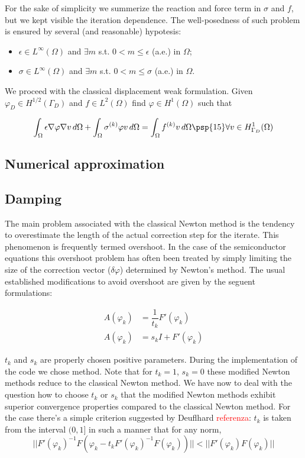 For the sake of simplicity we summerize the reaction and force term in $\sigma$ and $f$, but we kept visible the iteration dependence.
The well-posedness of such problem is ensured by several (and reasonable) hypotesis:
\begin{itemize}
\item $\epsilon \in L^{\infty}(\Omega)$ and $\exists m$ s.t. $0 < m \leq \epsilon$ (a.e.) in $\Omega$;
\item  $\sigma \in L^{\infty}(\Omega)$ and $\exists m$ s.t. $0 < m \leq \sigma$ (a.e.) in $\Omega$.
\end{itemize}

We proceed with the classical displacement weak formulation.
Given $\varphi_D \in H^{1/2}(\Gamma_D)$ and $f \in L^2(\Omega)$ find $\varphi \in H^1(\Omega)$ such that 

\begin{equation}
\int_{\Omega} \epsilon \nabla \varphi \nabla v \, d\Omega + \int_{\Omega} \sigma^{(k)}\varphi v \, d\Omega = \int_{\Omega} f^{(k)}v \, d\Omega \psp{15} \forall v \in H^1_{\Gamma_D}(\Omega)
\end{equation}

\subsection{Numerical approximation}

\subsection{Damping}
The main problem associated with the classical Newton method is the tendency to overestimate the length of the actual correction step for the iterate. This phenomenon is frequently termed overshoot. In the case of the semiconductor equations this overshoot problem has often been treated by simply limiting the size of the correction vector ($\delta \varphi$) determined by Newton's method. The usual established modifications to avoid overshoot are given by the seguent formulations:


\begin{align}
A(\varphi_k)&=\dfrac{1}{t_k}F'(\varphi_k) \label{eq: NLP mod used} \\
A(\varphi_k)&=s_kI+F'(\varphi_k) \label{eq: NLP mod not used}
\end{align}

$t_k$ and $s_k$ are properly chosen positive parameters. During the implementation of the code we chose  method. Note that for $t_k=1$, $s_k=0$ these modified Newton methods reduce to the classical Newton method. We have now to deal with the question how to choose $t_k$ or $s_k$ that the modified Newton methods exhibit superior convergence properties compared to the classical Newton method.
For the case  there's a simple criterion suggested by Deuflhard \textcolor{red}{referenza}: $t_k$ is taken from the interval $(0,1]$ in such a manner that for any norm,
\begin{equation}
\label{eq: extended criterion}
||F'(\varphi_k)^{-1}F(\varphi_k-t_kF'(\varphi_k)^{-1}F(\varphi_k))||<||F'(\varphi_k)F(\varphi_k)||
\end{equation}


